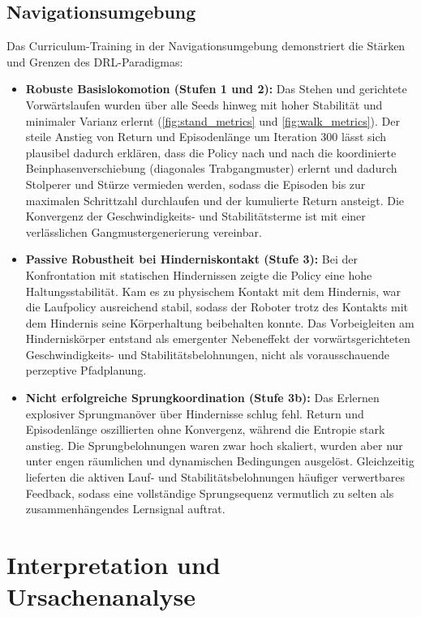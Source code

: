 \subsection{Navigationsumgebung}
Das Curriculum-Training in der Navigationsumgebung demonstriert die Stärken und Grenzen des DRL-Paradigmas:
\begin{itemize}
	\item \textbf{Robuste Basislokomotion (Stufen 1 und 2):} Das Stehen und gerichtete Vorwärtslaufen wurden über alle Seeds hinweg mit hoher Stabilität und minimaler Varianz erlernt (\autoref{fig:stand_metrics} und \autoref{fig:walk_metrics}). Der steile Anstieg von Return und Episodenlänge um Iteration 300 lässt sich plausibel dadurch erklären, dass die Policy nach und nach die koordinierte Beinphasenverschiebung (diagonales Trabgangmuster) erlernt und dadurch Stolperer und Stürze vermieden werden, sodass die Episoden bis zur maximalen Schrittzahl durchlaufen und der kumulierte Return ansteigt. Die Konvergenz der Geschwindigkeits- und Stabilitätsterme ist mit einer verlässlichen Gangmustergenerierung vereinbar.
	\item \textbf{Passive Robustheit bei Hinderniskontakt (Stufe 3):} Bei der Konfrontation mit statischen Hindernissen zeigte die Policy eine hohe Haltungsstabilität. Kam es zu physischem Kontakt mit dem Hindernis, war die Laufpolicy ausreichend stabil, sodass der Roboter trotz des Kontakts mit dem Hindernis seine Körperhaltung beibehalten konnte. Das Vorbeigleiten am Hinderniskörper entstand als emergenter Nebeneffekt der vorwärtsgerichteten Geschwindigkeits- und Stabilitätsbelohnungen, nicht als vorausschauende perzeptive Pfadplanung.
	\item \textbf{Nicht erfolgreiche Sprungkoordination (Stufe 3b):} Das Erlernen explosiver Sprungmanöver über Hindernisse schlug fehl. Return und Episodenlänge oszillierten ohne Konvergenz, während die Entropie stark anstieg. Die Sprungbelohnungen waren zwar hoch skaliert, wurden aber nur unter engen räumlichen und dynamischen Bedingungen ausgelöst. Gleichzeitig lieferten die aktiven Lauf- und Stabilitätsbelohnungen häufiger verwertbares Feedback, sodass eine vollständige Sprungsequenz vermutlich zu selten als zusammenhängendes Lernsignal auftrat.
\end{itemize}

\section{Interpretation und Ursachenanalyse}

